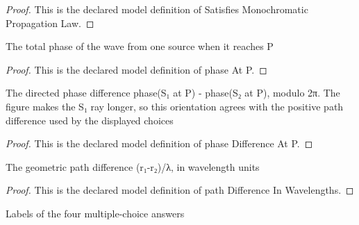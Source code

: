 \begin{proof}
  This is the declared model definition of Satisfies Monochromatic Propagation Law.
\end{proof}
\begin{definition}[phase At P]
  \label{def:physics:phyx-mini-0090:phyxminiproblems-problemphyxmini0090-phaseatp}
  The total phase of the wave from one source when it reaches P
\end{definition}
\begin{proof}
  This is the declared model definition of phase At P.
\end{proof}
\begin{definition}
  \label{def:physics:phyx-mini-0090:phyxminiproblems-problemphyxmini0090-phasedifferenceatp}
  The directed phase difference phase(S₁ at P) - phase(S₂ at P), modulo 2π. The figure makes the S₁ ray longer, so this orientation agrees with the positive path difference used by the displayed choices
\end{definition}
\begin{proof}
  This is the declared model definition of phase Difference At P.
\end{proof}
\begin{definition}
  \label{def:physics:phyx-mini-0090:phyxminiproblems-problemphyxmini0090-pathdifferenceinwavelengths}
  The geometric path difference (r₁-r₂)/λ, in wavelength units
\end{definition}
\begin{proof}
  This is the declared model definition of path Difference In Wavelengths.
\end{proof}
\begin{definition}
  \label{def:physics:phyx-mini-0090:phyxminiproblems-problemphyxmini0090-answerchoice}
  Labels of the four multiple-choice answers
\end{definition}
